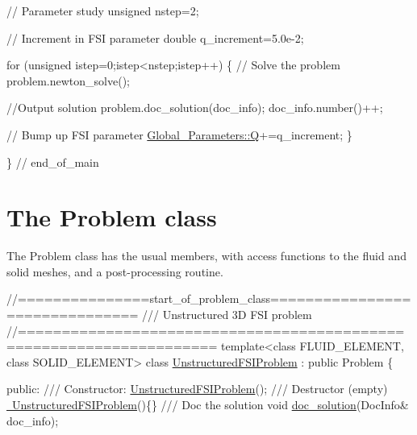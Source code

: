 \begin{DoxyCodeInclude}

 \textcolor{comment}{// Parameter study}
 \textcolor{keywordtype}{unsigned} nstep=2;

 \textcolor{comment}{// Increment in FSI parameter}
 \textcolor{keywordtype}{double} q\_increment=5.0e-2;

 \textcolor{keywordflow}{for} (\textcolor{keywordtype}{unsigned} istep=0;istep<nstep;istep++)
  \{
   \textcolor{comment}{// Solve the problem}
   problem.newton\_solve();
   
   \textcolor{comment}{//Output solution}
   problem.doc\_solution(doc\_info);
   doc\_info.number()++;

   \textcolor{comment}{// Bump up FSI parameter}
   \hyperlink{namespaceGlobal__Parameters_a7814fddf663e56168174a42d2cd6b4c1}{Global\_Parameters::Q}+=q\_increment;   
  \}

\} \textcolor{comment}{// end\_of\_main}

\end{DoxyCodeInclude}




 

\hypertarget{index_class}{}\section{The Problem class}\label{index_class}
The {\ttfamily Problem} class has the usual members, with access functions to the fluid and solid meshes, and a post-\/processing routine.

 
\begin{DoxyCodeInclude}
\textcolor{comment}{//===============start\_of\_problem\_class===============================}
\textcolor{comment}{/// Unstructured 3D FSI problem}
\textcolor{comment}{}\textcolor{comment}{//====================================================================}
\textcolor{keyword}{template}<\textcolor{keyword}{class} FLUID\_ELEMENT, \textcolor{keyword}{class} SOLID\_ELEMENT>
\textcolor{keyword}{class }\hyperlink{classUnstructuredFSIProblem}{UnstructuredFSIProblem} : \textcolor{keyword}{public} Problem
\{

\textcolor{keyword}{public}:
\textcolor{comment}{}
\textcolor{comment}{ /// Constructor: }
\textcolor{comment}{} \hyperlink{classUnstructuredFSIProblem_a6a31fd839e0215ef1312942cf7284bd2}{UnstructuredFSIProblem}();
\textcolor{comment}{}
\textcolor{comment}{ /// Destructor (empty)}
\textcolor{comment}{} \hyperlink{classUnstructuredFSIProblem_a976a81e0dee902f6713bd8ca4d79d000}{~UnstructuredFSIProblem}()\{\}
\textcolor{comment}{}
\textcolor{comment}{ /// Doc the solution}
\textcolor{comment}{} \textcolor{keywordtype}{void} \hyperlink{classUnstructuredFSIProblem_a15f581318b505de07f50bd570da8c8d0}{doc\_solution}(DocInfo& doc\_info);

\end{DoxyCodeInclude}


